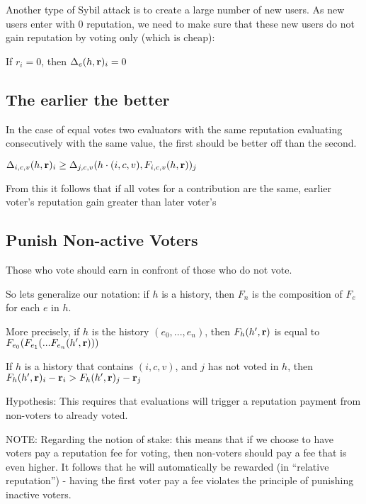 \documentclass{article}
\begin{document}
Another type of Sybil attack is to create a large number of new users. As new users enter with 0 reputation, we need to make sure that these new users do not gain reputation by voting only (which is cheap): 
\begin{center}
If $r_i =0$, then $\Delta_e(h, {\bf r})_i = 0$
\end{center}

\subsection{The earlier the better}


In the case of equal votes two evaluators with the same reputation evaluating consecutively with the same value, the first should be better off than the second.

\begin{center}
$\Delta_{i, c, v}(h, {\bf r})_i \ge \Delta_{j, c, v}(h\cdot(i,c,v), F_{i,c,v}(h, {\bf r}))_j$
\end{center}
From this it follows that if all votes for a contribution are the same, earlier voter’s reputation gain greater than later voter’s
\subsection{Punish Non-active Voters}

Those who vote should earn in confront of those who do not vote.

So lets generalize our notation: if $h$ is a history, then $F_n$ is the composition of $F_e$ for each $e$ in $h$. 

More precisely, if $h$ is the history $(e_0, ..., e_n)$, then $F_h(h', {\bf r})$ is equal to $F_{e_0}(F_{e_1}(... F_{e_n}(h', {\bf r})))$


\begin{center}
If $h$ is a history that contains $(i, c, v)$, and $j$ has not voted in $h$, then $F_h(h', {\bf r})_i - {\bf r}_i > F_h(h', {\bf r})_j - {\bf r}_j$
\end{center}

Hypothesis: This requires that evaluations will trigger a reputation payment from non-voters to already voted.

NOTE: Regarding the notion of stake: this means that if we choose to have voters pay a reputation fee for voting, then non-voters should pay a fee that is even higher. 
It follows that he will automatically be rewarded (in ``relative reputation'') - having the first voter pay a fee violates the principle of punishing inactive voters.
\end{document}

